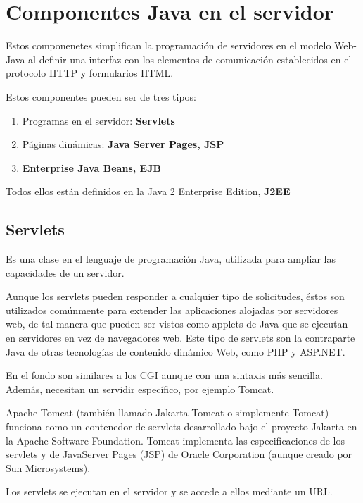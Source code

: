 \documentclass{apuntes}
\begin{document}
\section{Componentes Java en el servidor}
Estos componenetes simplifican la programación de servidores en el modelo Web-Java al definir una interfaz con los elementos de comunicación establecidos en el protocolo HTTP y formularios HTML.

Estos componentes pueden ser de tres tipos:
\begin{enumerate}
\item Programas en el servidor: \textbf{Servlets}
\item Páginas dinámicas: \textbf{Java Server Pages, JSP}
\item \textbf{Enterprise Java Beans, EJB}
\end{enumerate}
Todos ellos están definidos en la Java 2 Enterprise Edition, \textbf{J2EE}

\subsection{Servlets}
\begin{defn}[Servlet]
Es una clase en el lenguaje de programación Java, utilizada para ampliar las capacidades de un servidor.
\end{defn}

Aunque los servlets pueden responder a cualquier tipo de solicitudes, éstos son utilizados comúnmente para extender las aplicaciones alojadas por servidores web, de tal manera que pueden ser vistos como applets de Java que se ejecutan en servidores en vez de navegadores web. Este tipo de servlets son la contraparte Java de otras tecnologías de contenido dinámico Web, como PHP y ASP.NET.

En el fondo son similares a los CGI aunque con una sintaxis más sencilla. Además, necesitan un servidir específico, por ejemplo Tomcat.

\begin{defn}[Tomcat]
Apache Tomcat (también llamado Jakarta Tomcat o simplemente Tomcat) funciona como un contenedor de servlets desarrollado bajo el proyecto Jakarta en la Apache Software Foundation. Tomcat implementa las especificaciones de los servlets y de JavaServer Pages (JSP) de Oracle Corporation (aunque creado por Sun Microsystems).
\end{defn}

Los servlets se ejecutan en el servidor y se accede a ellos mediante un URL.
\end{document}
